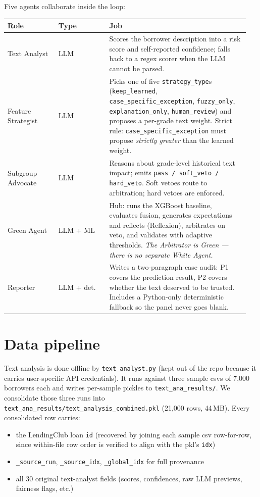 \documentclass[11pt,letterpaper]{article}
\begin{document}
Five agents collaborate inside the loop:

\begin{center}\small
\begin{tabular}{@{}p{0.20\linewidth}p{0.20\linewidth}p{0.55\linewidth}@{}}
\toprule
\textbf{Role} & \textbf{Type} & \textbf{Job} \\
\midrule
Text Analyst       & LLM        & Scores the borrower description into a
risk score and self-reported confidence; falls back to a regex scorer when
the LLM cannot be parsed. \\
Feature Strategist & LLM        & Picks one of five \texttt{strategy\_type}s
(\texttt{keep\_learned}, \texttt{case\_specific\_exception}, \texttt{fuzzy\_only},
\texttt{explanation\_only}, \texttt{human\_review}) and proposes a per-grade
text weight. Strict rule: \texttt{case\_specific\_exception} must propose
\emph{strictly greater} than the learned weight. \\
Subgroup Advocate  & LLM        & Reasons about grade-level historical text
impact; emits \texttt{pass / soft\_veto / hard\_veto}. Soft vetoes route to
arbitration; hard vetoes are enforced. \\
Green Agent        & LLM + ML   & Hub: runs the XGBoost baseline, evaluates
fusion, generates expectations and reflects (Reflexion), arbitrates on veto,
and validates with adaptive thresholds. \emph{The Arbitrator is Green ---
there is no separate White Agent.} \\
Reporter           & LLM + det. & Writes a two-paragraph case audit: P1
covers the prediction result, P2 covers whether the text deserved to be
trusted. Includes a Python-only deterministic fallback so the panel
never goes blank. \\
\bottomrule
\end{tabular}
\end{center}

\section{Data pipeline}
Text analysis is done offline by \texttt{text\_analyst.py} (kept out of the
repo because it carries user-specific API credentials). It runs against
three sample csvs of 7{,}000 borrowers each and writes per-sample pickles
to \texttt{text\_ana\_results/}. We consolidate those three runs into
\texttt{text\_ana\_results/text\_analysis\_combined.pkl} (21{,}000 rows,
44\,MB). Every consolidated row carries:

\begin{itemize}
  \item the LendingClub loan \texttt{id} (recovered by joining each sample
        csv row-for-row, since within-file row order is verified to align
        with the pkl's \texttt{idx})
  \item \texttt{\_source\_run}, \texttt{\_source\_idx}, \texttt{\_global\_idx}
        for full provenance
  \item all 30 original text-analyst fields (scores, confidences, raw LLM
        previews, fairness flags, etc.)
\end{itemize}
\end{document}
